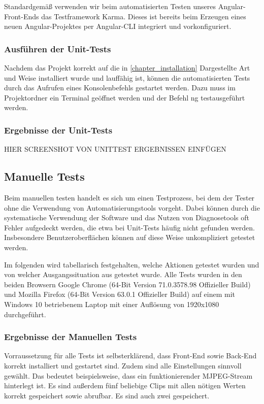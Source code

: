 Standardgemäß verwenden wir beim automatisierten Testen unseres Angular-Front-Ends das Testframework Karma. Dieses ist bereits beim Erzeugen eines neuen Angular-Projektes per Angular-\acs{CLI} integriert und vorkonfiguriert. 

\subsubsection{Ausführen der Unit-Tests}
Nachdem das Projekt korrekt auf die in \ref{chapter_installation} Dargestellte Art und Weise installiert wurde und lauffähig ist, können die automatisierten Tests durch das Aufrufen eines Konsolenbefehls gestartet werden. Dazu muss im Projektordner ein Terminal geöffnet werden und der Befehl \glqq{}ng test\grqq ausgeführt werden.

\subsubsection{Ergebnisse der Unit-Tests}
HIER SCREENSHOT VON UNITTEST ERGEBNISSEN EINFÜGEN


\subsection{Manuelle Tests}
Beim manuellen testen handelt es sich um einen Testprozess, bei dem der Tester ohne die Verwendung von Automatisierungstools vorgeht. Dabei können durch die systematische Verwendung der Software und das Nutzen von Diagnosetools oft Fehler aufgedeckt werden, die etwa bei Unit-Tests häufig nicht gefunden werden. Insbesondere Benutzeroberflächen können auf diese Weise unkompliziert getestet werden.

Im folgenden wird tabellarisch festgehalten, welche Aktionen getestet wurden und von welcher Ausgangssituation aus getestet wurde. Alle Tests wurden in den beiden Browsern Google Chrome (64-Bit Version 71.0.3578.98 Offizieller Build) und Mozilla Firefox (64-Bit Version 63.0.1 Offizieller Build) auf einem mit Windows 10 betriebenem Laptop mit einer Auflösung von 1920x1080 durchgeführt. 

\subsubsection{Ergebnisse der Manuellen Tests}
Vorraussetzung für alle Tests ist selbsterklärend, dass Front-End sowie Back-End korrekt installiert und gestartet sind. Zudem sind alle Einstellungen sinnvoll gewählt. Das bedeutet beispielsweise, dass ein funktionierender MJPEG-Stream hinterlegt ist. Es sind außerdem fünf beliebige Clips mit allen nötigen Werten korrekt gespeichert sowie abrufbar. Es sind auch zwei gespeichert.

